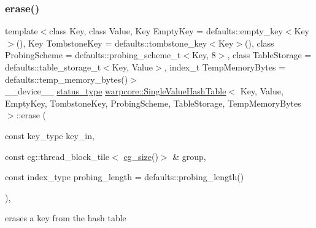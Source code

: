 \subsubsection{\texorpdfstring{erase()}{erase()}\hspace{0.1cm}{\footnotesize\ttfamily [1/2]}}
{\footnotesize\ttfamily template$<$class Key, class Value, Key Empty\+Key = defaults\+::empty\+\_\+key$<$\+Key$>$(), Key Tombstone\+Key = defaults\+::tombstone\+\_\+key$<$\+Key$>$(), class Probing\+Scheme = defaults\+::probing\+\_\+scheme\+\_\+t$<$\+Key, 8$>$, class Table\+Storage = defaults\+::table\+\_\+storage\+\_\+t$<$\+Key, Value$>$, index\+\_\+t Temp\+Memory\+Bytes = defaults\+::temp\+\_\+memory\+\_\+bytes()$>$ \\
\+\_\+\+\_\+device\+\_\+\+\_\+ \hyperlink{classwarpcore_1_1Status}{status\+\_\+type} \hyperlink{classwarpcore_1_1SingleValueHashTable}{warpcore\+::\+Single\+Value\+Hash\+Table}$<$ Key, Value, Empty\+Key, Tombstone\+Key, Probing\+Scheme, Table\+Storage, Temp\+Memory\+Bytes $>$\+::erase (\begin{DoxyParamCaption}\item[{const key\+\_\+type}]{key\+\_\+in,  }\item[{const cg\+::thread\+\_\+block\+\_\+tile$<$ \hyperlink{classwarpcore_1_1SingleValueHashTable_aaa4cf7e3252a0b177101fca437e5309e}{cg\+\_\+size}()$>$ \&}]{group,  }\item[{const index\+\_\+type}]{probing\+\_\+length = {\ttfamily defaults\+:\+:probing\+\_\+length()} }\end{DoxyParamCaption})\hspace{0.3cm}{\ttfamily [inline]}, {\ttfamily [noexcept]}}



erases a key from the hash table 



